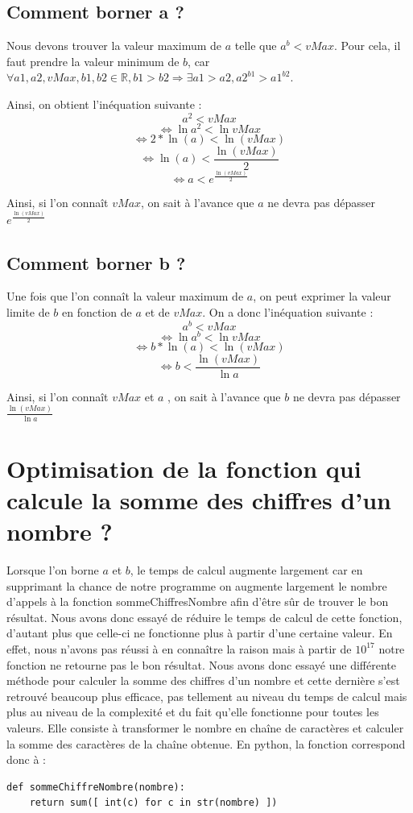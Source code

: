 \documentclass{article}
\begin{document}
\subsection{Comment borner a ?}

	Nous devons trouver la valeur maximum de $a$ telle que $a^{b} < vMax$. Pour cela, il faut prendre la valeur minimum de $b$, car $\forall a1, a2, vMax, b1, b2 \in \mathbb{R}, b1 > b2 \Rightarrow \exists a1 > a2, a2^{b1} > a1^{b2}$.

Ainsi, on obtient l'inéquation suivante : \[ a^{2} < vMax \]
 \[ \Leftrightarrow \ln{a^{2}} < \ln{vMax} \]
\[ \Leftrightarrow 2*\ln(a) < \ln(vMax)  \]
\[ \Leftrightarrow \ln(a) < \frac{\ln(vMax)}{2}  \]
\[  \Leftrightarrow a < e^{\frac{\ln(vMax)}{2}} \]

Ainsi, si l'on connaît $vMax$, on sait à l'avance que $a$ ne devra pas dépasser $e^{\frac{\ln(vMax)}{2}}$


\subsection{Comment borner b ?}

Une fois que l'on connaît la valeur maximum de $a$, on peut exprimer la valeur limite de $b$ en fonction de $a$ et de $vMax$. On a donc l'inéquation suivante :  \[ a^{b} < vMax \]
 \[ \Leftrightarrow \ln{a^{b}} < \ln{vMax} \]
\[ \Leftrightarrow b*\ln(a) < \ln(vMax)  \]
\[ \Leftrightarrow b < \frac{\ln(vMax)}{\ln{a}}  \]

Ainsi, si l'on connaît $vMax$ et $a$ , on sait à l'avance que $b$ ne devra pas dépasser $\frac{\ln(vMax)}{\ln{a}}$

\section{Optimisation de la fonction qui calcule la somme des chiffres d'un nombre ?}

Lorsque l'on borne $a$ et $b$, le temps de calcul augmente largement car en supprimant la chance de notre programme on augmente largement le nombre d'appels à la fonction sommeChiffresNombre afin d'être sûr de trouver le bon résultat. Nous avons donc essayé de réduire le temps de calcul de cette fonction, d'autant plus que celle-ci ne fonctionne plus à partir d'une certaine valeur. En effet, nous n'avons pas réussi à en connaître la raison mais à partir de $10^{17}$ notre fonction ne retourne pas le bon résultat. Nous avons donc essayé une différente méthode pour calculer la somme des chiffres d'un nombre et cette dernière s'est retrouvé beaucoup plus efficace, pas tellement au niveau du temps de calcul mais plus au niveau de la complexité et du fait qu'elle fonctionne pour toutes les valeurs. Elle consiste à transformer le nombre en chaîne de caractères et calculer la somme des caractères de la chaîne obtenue. En python, la fonction correspond donc à :
\begin{lstlisting}
def sommeChiffreNombre(nombre):
    return sum([ int(c) for c in str(nombre) ])
\end{lstlisting}
\end{document}
